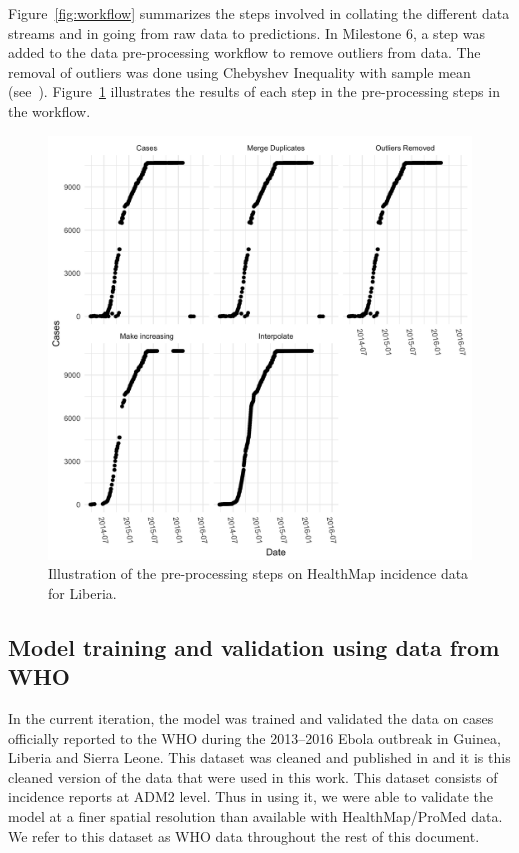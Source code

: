 \documentclass[11pt,]{article}
\begin{document}
Figure~\ref{fig:workflow} summarizes the steps involved in collating
the different data streams and in going from raw data to predictions. In Milestone 6, a step was added to the data pre-processing workflow
to remove outliers from data. The removal of outliers was done using Chebyshev Inequality
with sample mean (see~\cite{saw1984chebyshev}). Figure~\ref{fig:wf_example} illustrates
the results of each step in the pre-processing steps in the workflow.

\begin{figure}
  \centering
  \includegraphics{ms6-figures/liberia-preprocessing}
  \caption{Illustration of the pre-processing steps on HealthMap incidence
    data for Liberia.}
  \label{fig:wf_example}
\end{figure}

\subsection{Model training and validation using data from
WHO}\label{model-training-and-validation-using-data-from-who}

In the current iteration, the model was trained and validated the data
on cases officially reported to the WHO during the 2013--2016 Ebola
outbreak in Guinea, Liberia and Sierra Leone. This dataset was cleaned
and published in \citep{garske20160308} and it is this cleaned version
of the data that were used in this work. This dataset consists of
incidence reports at ADM2 level. Thus in using it, we were able to validate the model at a finer spatial resolution than available
with HealthMap/ProMed data. We refer to this dataset as WHO data
throughout the rest of this document.
\end{document}
